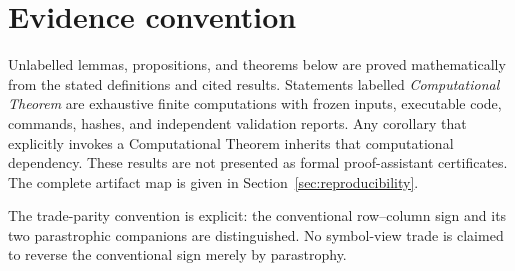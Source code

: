 \section*{Evidence convention}

Unlabelled lemmas, propositions, and theorems below are proved mathematically
from the stated definitions and cited results.  Statements labelled
\emph{Computational Theorem} are exhaustive finite computations with frozen
inputs, executable code, commands, hashes, and independent validation reports.
Any corollary that explicitly invokes a Computational Theorem inherits that
computational dependency.  These results are not presented as formal
proof-assistant certificates.  The complete artifact map is given in
Section~\ref{sec:reproducibility}.

The trade-parity convention is explicit: the conventional row--column sign
and its two parastrophic companions are distinguished.  No symbol-view trade
is claimed to reverse the conventional sign merely by parastrophy.
